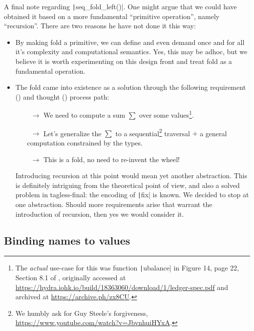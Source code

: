 \documentclass[11pt]{article}
\newcommand{\ScalaI}[1]{\texttt|#1|}
\newcommand{\TextI}[1]{\texttt|#1|}
\begin{document}
A final note regarding \ScalaI{seq_fold_left()}. One might argue that we could have obtained it based on a more fundamental ``primitive operation'', namely ``recursion''. There are two reasons he have not done it this way:
\begin{itemize}
  \item By making fold a primitive, we can define and even demand once and for all it's complexity and computational semantics. Yes, this may be adhoc, but we believe it is worth experimenting on this design front and treat fold as a fundamental operation.
  
  \item The fold came into existence as a solution through the following requirement (\faBook) and thought (\faLightbulbO) process path:  
  \begin{itemize}
    \item[\faBook~$\longrightarrow$] We need to compute a sum $\sum$ over some values\footnote{The \textit{actual} use-case for this was function \TextI{ubalance} in Figure 14, page 22, Section 8.1 of \cite{cardano:ledger-spec:shelley:2019}, originally accessed at \href{https://hydra.iohk.io/build/18363060/download/1/ledger-spec.pdf}{https://hydra.iohk.io/build/18363060/download/1/ledger-spec.pdf} and archived at \href{https://archive.ph/zx8CU}{https://archive.ph/zx8CU}.}.
    \item[\faLightbulbO~$\longrightarrow$] Let's generalize the $\sum$ to a sequential\footnote{We humbly ask for Guy Steele's forgiveness, \href{https://www.youtube.com/watch?v=JbvnhuiHYxA}{https://www.youtube.com/watch?v=JbvnhuiHYxA}.} traversal $+$ a general computation constrained by the types.
    \item[\faLightbulbO~$\longrightarrow$] This is a fold, no need to re-invent the wheel!
  \end{itemize}
  
    Introducing recursion at this point would mean yet another abstraction. This is definitely intriguing from the theoretical point of view, and also a solved problem in tagless-final: the encoding of \TextI{fix} is known. We decided to stop at one abstraction. Should more requirements arise that warrant the introduction of recursion, then yes we would consider it.
\end{itemize}


\subsection{Binding names to values}
\label{sec:bind}
\end{document}
